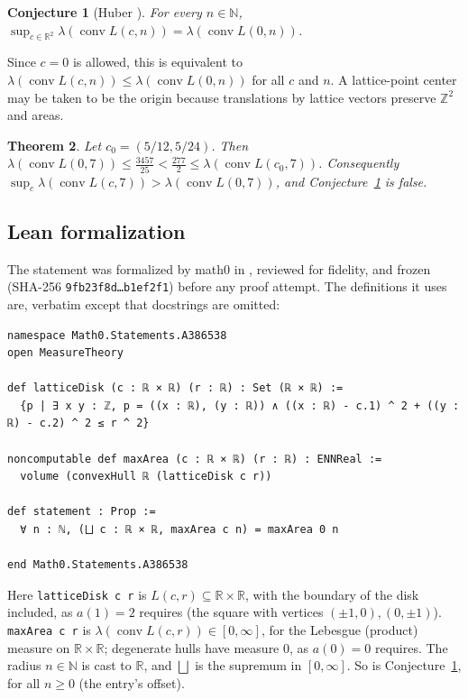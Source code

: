 \documentclass[11pt]{amsart}
\theoremstyle{plain}
\newtheorem{theorem}{Theorem}
\newtheorem{conjecture}[theorem]{Conjecture}
\theoremstyle{definition}
\newcommand{\Z}{\mathbb{Z}}
\newcommand{\R}{\mathbb{R}}
\newcommand{\N}{\mathbb{N}}
\DeclareMathOperator{\conv}{conv}
\newcommand{\vol}{\lambda}
\begin{document}
\begin{conjecture}[Huber \cite{A386538}]\label{conj}
For every $n\in\N$, $\sup_{c\in\R^2}\vol(\conv L(c,n))=\vol(\conv L(0,n))$.
\end{conjecture}

Since $c=0$ is allowed, this is equivalent to $\vol(\conv L(c,n))\le\vol(\conv L(0,n))$ for all $c$ and $n$. A lattice-point center may be taken to be the origin because translations by lattice vectors preserve $\Z^2$ and areas.

\begin{theorem}\label{thm:main}
Let $c_0=(5/12,5/24)$. Then
$\vol(\conv L(0,7))\le\frac{3457}{25}<\frac{277}{2}\le\vol(\conv L(c_0,7))$.
Consequently $\sup_{c}\vol(\conv L(c,7))>\vol(\conv L(0,7))$, and Conjecture~\ref{conj} is false.
\end{theorem}

\subsection*{Lean formalization}
The statement was formalized by math0 in , reviewed for fidelity, and frozen (SHA-256 \texttt{9fb23f8d\ldots b1ef2f1}) before any proof attempt. The definitions it uses are, verbatim except that docstrings are omitted:
\begin{lstlisting}
namespace Math0.Statements.A386538
open MeasureTheory

def latticeDisk (c : ℝ × ℝ) (r : ℝ) : Set (ℝ × ℝ) :=
  {p | ∃ x y : ℤ, p = ((x : ℝ), (y : ℝ)) ∧ ((x : ℝ) - c.1) ^ 2 + ((y : ℝ) - c.2) ^ 2 ≤ r ^ 2}

noncomputable def maxArea (c : ℝ × ℝ) (r : ℝ) : ENNReal :=
  volume (convexHull ℝ (latticeDisk c r))

def statement : Prop :=
  ∀ n : ℕ, (⨆ c : ℝ × ℝ, maxArea c n) = maxArea 0 n

end Math0.Statements.A386538
\end{lstlisting}
Here \texttt{latticeDisk c r} is $L(c,r)\subseteq\R\times\R$, with the boundary of the disk included, as $a(1)=2$ requires (the square with vertices $(\pm1,0),(0,\pm1)$). \texttt{maxArea c r} is $\vol(\conv L(c,r))\in[0,\infty]$, for the Lebesgue (product) measure on $\R\times\R$; degenerate hulls have measure $0$, as $a(0)=0$ requires. The radius $n\in\N$ is cast to $\R$, and $\bigsqcup$ is the supremum in $[0,\infty]$. So  is Conjecture~\ref{conj}, for all $n\ge0$ (the entry's offset).
\end{document}
